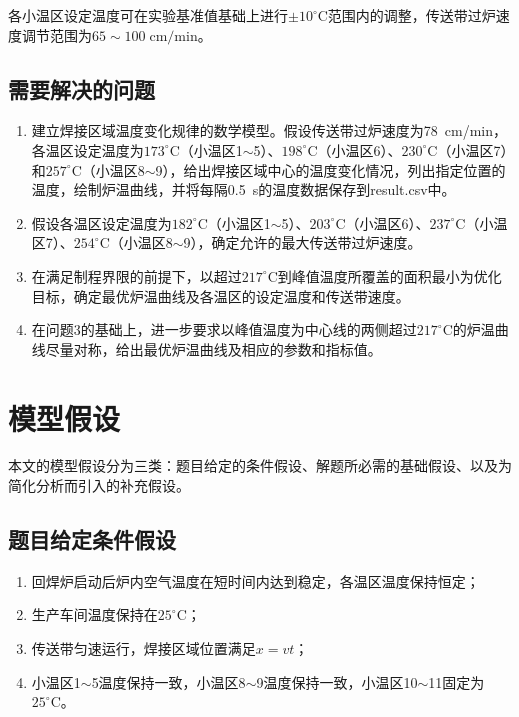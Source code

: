 \documentclass[12pt,a4paper]{ctexart}
\begin{document}
各小温区设定温度可在实验基准值基础上进行$\pm10^{\circ}\mathrm{C}$范围内的调整，传送带过炉速度调节范围为$65\sim100\;\mathrm{cm/min}$。

\subsection{需要解决的问题}

\begin{enumerate}[label=\textbf{问题\arabic*：},nosep,leftmargin=4.5em,labelsep=0.5em,itemindent=0pt]
    \item 建立焊接区域温度变化规律的数学模型。假设传送带过炉速度为78~cm/min，各温区设定温度为$173^{\circ}\mathrm{C}$（小温区1$\sim$5）、$198^{\circ}\mathrm{C}$（小温区6）、$230^{\circ}\mathrm{C}$（小温区7）和$257^{\circ}\mathrm{C}$（小温区8$\sim$9），给出焊接区域中心的温度变化情况，列出指定位置的温度，绘制炉温曲线，并将每隔0.5~s的温度数据保存到result.csv中。
    \item 假设各温区设定温度为$182^{\circ}\mathrm{C}$（小温区1$\sim$5）、$203^{\circ}\mathrm{C}$（小温区6）、$237^{\circ}\mathrm{C}$（小温区7）、$254^{\circ}\mathrm{C}$（小温区8$\sim$9），确定允许的最大传送带过炉速度。
    \item 在满足制程界限的前提下，以超过$217^{\circ}\mathrm{C}$到峰值温度所覆盖的面积最小为优化目标，确定最优炉温曲线及各温区的设定温度和传送带速度。
    \item 在问题3的基础上，进一步要求以峰值温度为中心线的两侧超过$217^{\circ}\mathrm{C}$的炉温曲线尽量对称，给出最优炉温曲线及相应的参数和指标值。
\end{enumerate}

\section{模型假设}

本文的模型假设分为三类：题目给定的条件假设、解题所必需的基础假设、以及为简化分析而引入的补充假设。

\subsection{题目给定条件假设}

\begin{enumerate}[label=\textbf{A\arabic*：},nosep]
    \item 回焊炉启动后炉内空气温度在短时间内达到稳定，各温区温度保持恒定；
    \item 生产车间温度保持在$25^{\circ}\mathrm{C}$；
    \item 传送带匀速运行，焊接区域位置满足$x=vt$；
    \item 小温区1$\sim$5温度保持一致，小温区8$\sim$9温度保持一致，小温区10$\sim$11固定为$25^{\circ}\mathrm{C}$。
\end{enumerate}
\end{document}
